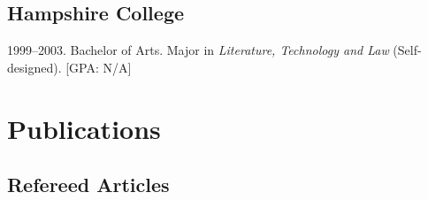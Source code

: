 \documentclass[10pt]{article}
\newenvironment{cvlist}{
\begin{list}{}{\leftmargin=3.0em \itemindent=-3.0em}
  \setlength{\itemsep}{0pt}
  \setlength{\parskip}{0em}
  \setlength{\parsep}{1em}
  \setlength{\parindent}{0em}}
{\vspace{1em}
\end{list}}
\begin{document}
\subsection{Hampshire College}
\begin{cvlist}
\item 1999--2003. Bachelor of Arts. Major in \emph{Literature,
    Technology and Law} (Self-designed). [GPA: N/A]
\end{cvlist}

\section{Publications}

\subsection{Refereed Articles}
\end{document}
